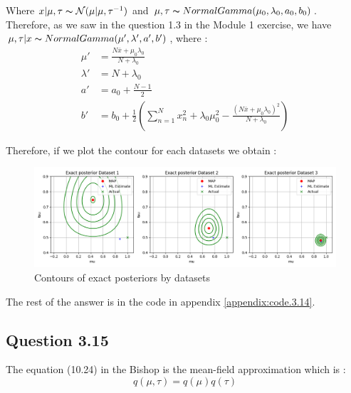\documentclass{article}
\begin{document}
Where $x|\mu, \tau \thicksim \mathcal{N}(\mu|\mu, \tau^{-1})$ and $\mu, \tau \thicksim NormalGamma(\mu_0, \lambda_0, a_0, b_0)$.
Therefore, as we saw in the question 1.3 in the Module 1 exercise, we have $\mu, \tau|x \thicksim NormalGamma(\mu', \lambda', a', b')$, where :
\begin{equation}
    \begin{split}
        \mu'     & = \frac{N\overline{x} + \mu_0\lambda_0}{N + \lambda_0}                                                                                       \\
        \lambda' & = N + \lambda_0                                                                                                                              \\
        a'       & = a_0 + \frac{N-1}{2}                                                                                                                        \\
        b'       & = b_0 + \frac{1}{2}\left(\sum_{n=1}^{N}x_n^2 + \lambda_0\mu_0^2 - \frac{\left(N\overline{x} + \mu_0\lambda_0\right)^2}{N + \lambda_0}\right)
    \end{split}
\end{equation}

Therefore, if we plot the contour for each datasets we obtain :
\begin{figure}[H]
    \centering
    \includegraphics[scale=0.5]{images/14_contours.png}
    \caption{Contours of exact posteriors by datasets}
    \label{fig:3.14}
\end{figure}

The rest of the answer is in the code in appendix \ref{appendix:code.3.14}.

\subsection*{Question 3.15}

The equation (10.24) in the Bishop is the mean-field approximation which is :
\begin{equation}
    q(\mu, \tau) = q(\mu)q(\tau)
\end{equation}
\end{document}
